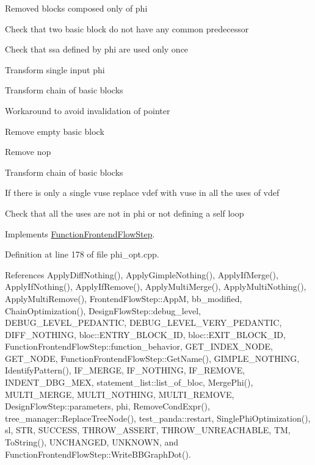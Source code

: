 Removed blocks composed only of phi

Check that two basic block do not have any common predecessor

Check that ssa defined by phi are used only once

Transform single input phi

Transform chain of basic blocks

Workaround to avoid invalidation of pointer

Remove empty basic block

Remove nop

Transform chain of basic blocks

If there is only a single vuse replace vdef with vuse in all the uses of vdef

Check that all the uses are not in phi or not defining a self loop 

Implements \hyperlink{classFunctionFrontendFlowStep_a00612f7fb9eabbbc8ee7e39d34e5ac68}{Function\+Frontend\+Flow\+Step}.



Definition at line 178 of file phi\+\_\+opt.\+cpp.



References Apply\+Diff\+Nothing(), Apply\+Gimple\+Nothing(), Apply\+If\+Merge(), Apply\+If\+Nothing(), Apply\+If\+Remove(), Apply\+Multi\+Merge(), Apply\+Multi\+Nothing(), Apply\+Multi\+Remove(), Frontend\+Flow\+Step\+::\+AppM, bb\+\_\+modified, Chain\+Optimization(), Design\+Flow\+Step\+::debug\+\_\+level, D\+E\+B\+U\+G\+\_\+\+L\+E\+V\+E\+L\+\_\+\+P\+E\+D\+A\+N\+T\+IC, D\+E\+B\+U\+G\+\_\+\+L\+E\+V\+E\+L\+\_\+\+V\+E\+R\+Y\+\_\+\+P\+E\+D\+A\+N\+T\+IC, D\+I\+F\+F\+\_\+\+N\+O\+T\+H\+I\+NG, bloc\+::\+E\+N\+T\+R\+Y\+\_\+\+B\+L\+O\+C\+K\+\_\+\+ID, bloc\+::\+E\+X\+I\+T\+\_\+\+B\+L\+O\+C\+K\+\_\+\+ID, Function\+Frontend\+Flow\+Step\+::function\+\_\+behavior, G\+E\+T\+\_\+\+I\+N\+D\+E\+X\+\_\+\+N\+O\+DE, G\+E\+T\+\_\+\+N\+O\+DE, Function\+Frontend\+Flow\+Step\+::\+Get\+Name(), G\+I\+M\+P\+L\+E\+\_\+\+N\+O\+T\+H\+I\+NG, Identify\+Pattern(), I\+F\+\_\+\+M\+E\+R\+GE, I\+F\+\_\+\+N\+O\+T\+H\+I\+NG, I\+F\+\_\+\+R\+E\+M\+O\+VE, I\+N\+D\+E\+N\+T\+\_\+\+D\+B\+G\+\_\+\+M\+EX, statement\+\_\+list\+::list\+\_\+of\+\_\+bloc, Merge\+Phi(), M\+U\+L\+T\+I\+\_\+\+M\+E\+R\+GE, M\+U\+L\+T\+I\+\_\+\+N\+O\+T\+H\+I\+NG, M\+U\+L\+T\+I\+\_\+\+R\+E\+M\+O\+VE, Design\+Flow\+Step\+::parameters, phi, Remove\+Cond\+Expr(), tree\+\_\+manager\+::\+Replace\+Tree\+Node(), test\+\_\+panda\+::restart, Single\+Phi\+Optimization(), sl, S\+TR, S\+U\+C\+C\+E\+SS, T\+H\+R\+O\+W\+\_\+\+A\+S\+S\+E\+RT, T\+H\+R\+O\+W\+\_\+\+U\+N\+R\+E\+A\+C\+H\+A\+B\+LE, TM, To\+String(), U\+N\+C\+H\+A\+N\+G\+ED, U\+N\+K\+N\+O\+WN, and Function\+Frontend\+Flow\+Step\+::\+Write\+B\+B\+Graph\+Dot().

